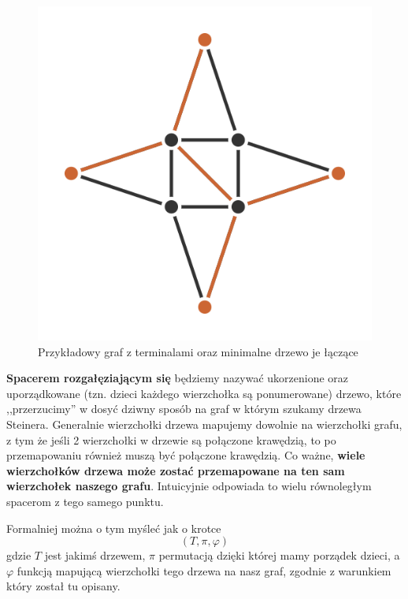\begin{figure}[H]
        \includegraphics[scale=0.4]{chapters/dyskretna/inclusion-exclusion/img/steiner_problem_example_tree.png}
        \caption{Przykładowy graf z terminalami oraz minimalne drzewo je łączące}
    \end{figure}
    
    
    \textbf{Spacerem rozgałęziającym się} będziemy nazywać ukorzenione oraz uporządkowane (tzn. dzieci każdego wierzchołka są ponumerowane) drzewo, które ,,przerzucimy'' w dosyć dziwny sposób na graf w którym szukamy drzewa Steinera. Generalnie wierzchołki drzewa mapujemy dowolnie na wierzchołki grafu, z tym że jeśli 2 wierzchołki w drzewie są połączone krawędzią, to po przemapowaniu również muszą być połączone krawędzią. Co ważne, \textbf{wiele wierzchołków drzewa może zostać przemapowane na ten sam wierzchołek naszego grafu}. Intuicyjnie odpowiada to wielu równoległym spacerom z tego samego punktu.
    
    Formalniej można o tym myśleć jak o krotce
    \begin{equation*}
        (T, \pi, \varphi)
    \end{equation*}
    gdzie $T$ jest jakimś drzewem, $\pi$ permutacją dzięki której mamy porządek dzieci, a $\varphi$ funkcją mapującą wierzchołki tego drzewa na nasz graf, zgodnie z warunkiem który został tu opisany.

